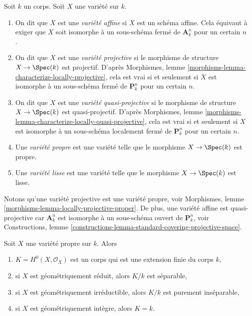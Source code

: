 \begin{definition}
\label{definition-variety-type}
 Soit $k$ un corps. Soit $X$ une variété sur $k$. 
\begin{enumerate}
\item On dit que $X$ est une {\it variété affine} si $X$ est un schéma
affine. Cela équivaut à exiger que $X$ soit isomorphe à un sous-schéma
fermé de $\mathbf{A}^n_k$ pour un certain $n$. 
\item On dit que $X$ est une {\it variété projective} si le
morphisme de structure $X \to \Spec(k)$ est projectif.
D'après Morphismes, lemme \ref{morphisms-lemma-characterize-locally-projective},
cela est vrai si et seulement si $X$ est isomorphe à un sous-schéma
fermé de $\mathbf{P}^n_k$ pour un certain $n$. 
\item On dit que $X$ est une {\it variété quasi-projective} si le
morphisme de structure $X \to \Spec(k)$ est quasi-projectif. D'après Morphismes, lemme
\ref{morphisms-lemma-characterize-locally-quasi-projective},
cela est vrai si et seulement si $X$ est isomorphe à
un sous-schéma localement fermé de $\mathbf{P}^n_k$ pour un certain $n$. 
\item Une {\it variété propre} est une variété telle que
le morphisme $X \to \Spec(k)$ est propre. 
\item Une {\it variété lisse} est une variété telle que
le morphisme $X \to \Spec(k)$ est lisse. 
\end{enumerate}
\end{definition}

\noindent
 Notons qu'une variété projective est une variété propre,
voir Morphismes, lemme \ref{morphisms-lemma-locally-projective-proper}.
De plus, une variété affine est quasi-projective car $\mathbf{A}^n_k$
 est isomorphe à un sous-schéma ouvert de $\mathbf{P}^n_k$,
voir Constructions,
lemme \ref{constructions-lemma-standard-covering-projective-space}.

\begin{lemma}
\label{lemma-regular-functions-proper-variety}
 Soit $X$ une variété propre sur $k$. Alors 
\begin{enumerate}
\item $K = H^0(X, \mathcal{O}_X)$ est un corps qui
est une extension finie du corps $k$, 
\item si $X$ est géométriquement réduit, alors $K/k$ est séparable, 
\item si $X$ est géométriquement irréductible, alors $K/k$
 est purement inséparable, 
\item si $X$ est géométriquement intègre, alors $K = k$. 
\end{enumerate}
\end{lemma}

